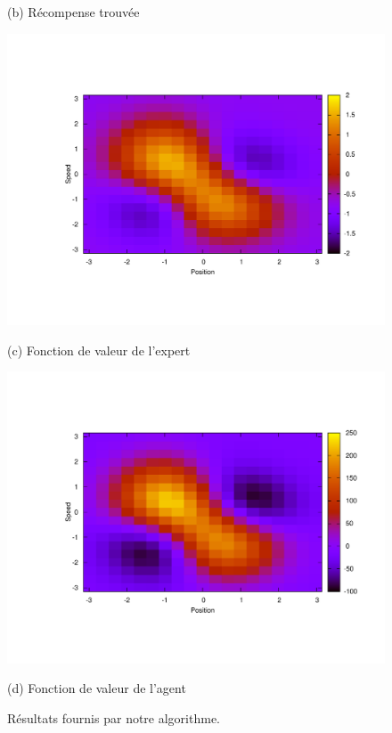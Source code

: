 \documentclass{article}
\begin{document}
\begin{figure}[ht]
\begin{center}
\begin{minipage}[b]{.5\linewidth}
  \centerline{(b) Récompense trouvée}%
\end{minipage}
\begin{minipage}[b]{.5\linewidth}
  \centering
  \centerline{\includegraphics[width=\columnwidth]{LAFEM_Exp3_Vexpert.pdf}}
  \centerline{(c) Fonction de valeur de l'expert}%
\end{minipage}
\hfill
\begin{minipage}[b]{.5\linewidth}
  \centering
  \centerline{\includegraphics[width=\columnwidth]{LAFEM_Exp3_Vagent.pdf}}
  \centerline{(d) Fonction de valeur de l'agent}%
\end{minipage}
%
\caption{Résultats fournis par notre algorithme.}
\label{onlyFig.fig}
%
\end{center}
\vskip -0.2in
\end{figure}
\end{document}
